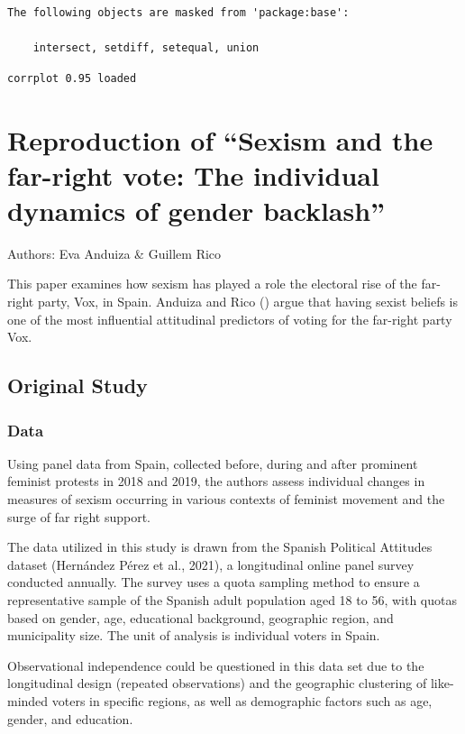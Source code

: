 \documentclass[
  letterpaper,
  DIV=11,
  numbers=noendperiod]{scrartcl}
\begin{document}
\begin{verbatim}
The following objects are masked from 'package:base':

    intersect, setdiff, setequal, union
\end{verbatim}

\begin{verbatim}
corrplot 0.95 loaded
\end{verbatim}

\section{Reproduction of ``Sexism and the far-right vote: The individual
dynamics of gender
backlash''}\label{reproduction-of-sexism-and-the-far-right-vote-the-individual-dynamics-of-gender-backlash}

Authors: Eva Anduiza \& Guillem Rico

This paper examines how sexism has played a role the electoral rise of
the far-right party, Vox, in Spain. Anduiza and Rico () argue that
having sexist beliefs is one of the most influential attitudinal
predictors of voting for the far-right party Vox.

\subsection{Original Study}\label{original-study}

\subsubsection{Data}\label{data}

Using panel data from Spain, collected before, during and after
prominent feminist protests in 2018 and 2019, the authors assess
individual changes in measures of sexism occurring in various contexts
of feminist movement and the surge of far right support.

The data utilized in this study is drawn from the Spanish Political
Attitudes dataset (Hernández Pérez et al., 2021), a longitudinal online
panel survey conducted annually. The survey uses a quota sampling method
to ensure a representative sample of the Spanish adult population aged
18 to 56, with quotas based on gender, age, educational background,
geographic region, and municipality size. The unit of analysis is
individual voters in Spain.

Observational independence could be questioned in this data set due to
the longitudinal design (repeated observations) and the geographic
clustering of like-minded voters in specific regions, as well as
demographic factors such as age, gender, and education.
\end{document}
